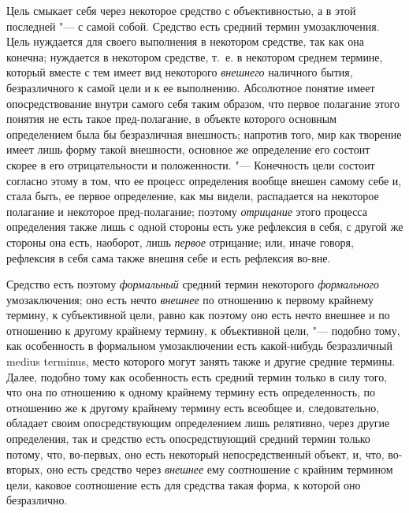 {{Цель смыкает себя через некоторое средство с объективностью, а
в этой последней "--- с самой собой. Средство есть средний
термин умозаключения. Цель нуждается для своего выполнения в некотором
средстве, так как она конечна; нуждается в некотором средстве, т.~е. в
некотором среднем термине, который вместе с тем имеет вид некоторого
{\em внешнего} наличного
бытия, безразличного к самой цели и к ее выполнению. Абсолютное понятие
имеет опосредствование внутри самого себя таким образом, что первое
полагание этого понятия не есть такое пред-полагание, в объекте
которого основным определением была бы безразличная внешность; напротив
того, мир как творение имеет лишь форму такой внешности, основное же
определение его состоит скорее в его отрицательности и положенности. "---
Конечность цели состоит согласно этому в том, что ее процесс
определения вообще внешен самому себе и, стала быть, ее первое определение,
как мы видели, распадается на некоторое полагание и некоторое
пред-полагание; поэтому {\em отрицание}
этого процесса определения также лишь с одной стороны есть
уже рефлексия в себя, с другой же стороны она есть, наоборот, лишь
{\em первое} отрицание;
или, иначе говоря, рефлексия в себя сама также внешня себе и есть рефлексия
во-вне.

Средство есть поэтому
{\em формальный} средний
термин некоторого {\em формального}
умозаключения; оно есть нечто
{\em внешнее} по
отношению к первому крайнему термину, к субъективной цели, равно как
поэтому оно есть нечто внешнее и по отношению к другому крайнему термину, к
объективной цели, "--- подобно тому, как особенность в
формальном умозаключении есть какой-нибудь безразличный medius terminus,
место которого могут занять также и другие средние термины.
Далее, подобно тому как особенность есть средний термин только в силу того,
что она по отношению к одному крайнему термину есть определенность, по
отношению же к другому крайнему термину есть всеобщее и, следовательно,
обладает своим опосредствующим определением лишь релятивно, через другие
определения, так и средство есть опосредствующий средний
термин только потому, что, во-первых, оно есть некоторый непосредственный
объект, и, что, во-вторых, оно есть средство через
{\em внешнее} ему
соотношение с крайним термином цели, каковое соотношение есть для средства
такая форма, к которой оно безразлично.

}}
